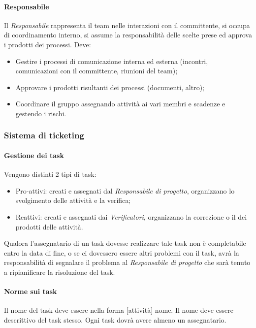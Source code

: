 \paragraph{Responsabile} \Spazio
Il \emph{Responsabile} rappresenta il team nelle interazioni con il committente, si occupa di coordinamento interno, si assume la responsabilità delle scelte prese ed approva i prodotti dei processi. Deve:
\begin{itemize}
\item Gestire i processi di comunicazione interna ed esterna (incontri, comunicazioni con il committente, riunioni del team);
\item Approvare i prodotti risultanti dei processi (documenti, altro);
\item Coordinare il gruppo assegnando attività ai vari membri e scadenze e gestendo i rischi.
\end{itemize}

\subsubsection{Sistema di ticketing}

\paragraph{Gestione dei task} \Spazio
Vengono distinti 2 tipi di task:
\begin{itemize}
\item Pro-attivi: creati e assegnati dal \emph{Responsabile di progetto}, organizzano lo svolgimento delle attività e la verifica;
\item Reattivi: creati e assegnati dai \emph{Verificatori}, organizzano la correzione o il  dei prodotti delle attività.
\end{itemize}
Qualora l'assegnatario di un task dovesse realizzare tale task non è completabile entro la data di fine, o se ci dovessero essere altri problemi con il task, avrà la responsabilità di segnalare il problema al \emph{Responsabile di progetto} che sarà tenuto a ripianificare la risoluzione del task.

\paragraph{Norme sui task} \Spazio
Il nome del task deve essere nella forma [attività] nome. Il nome deve essere descrittivo del task stesso. Ogni task dovrà avere almeno un assegnatario.

